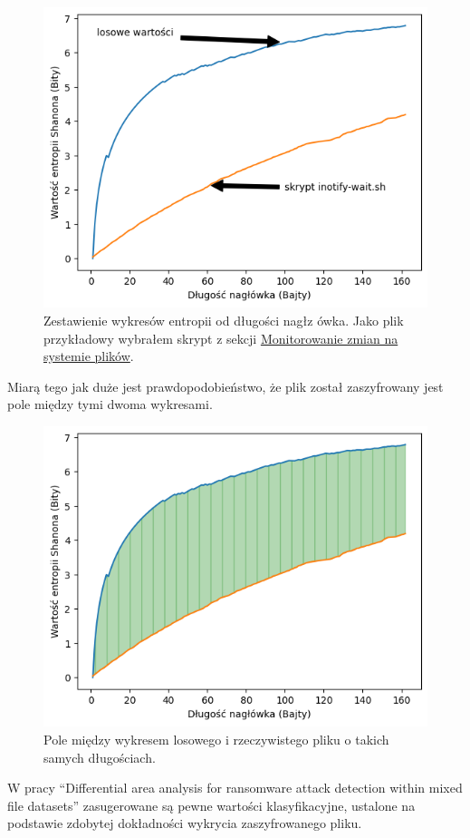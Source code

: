 \begin{figure}[H]
    \centering
    \includegraphics[width=0.7\linewidth]{rysunki/zestawienie.png}
    \caption{Zestawienie wykresów entropii od długości nagłz ówka. Jako plik przykładowy wybrałem skrypt z sekcji \hyperref[sec:monitorowanie]{Monitorowanie zmian na systemie plików}.}
    \label{fig:enter-label}
\end{figure}
Miarą tego jak duże jest prawdopodobieństwo, że plik został zaszyfrowany jest pole między tymi dwoma wykresami.
\begin{figure}[H]
    \centering
    \includegraphics[width=0.7\linewidth]{rysunki/pole.png}
    \caption{Pole między wykresem losowego i rzeczywistego pliku o takich samych długościach.}
    \label{fig:enter-label}
\end{figure}
W pracy \foreignquote{english}{Differential area analysis for ransomware
attack detection within mixed file datasets} zasugerowane są pewne wartości klasyfikacyjne, ustalone na podstawie
zdobytej dokładności wykrycia zaszyfrowanego pliku.
